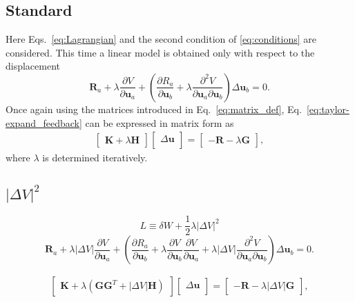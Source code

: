 \subsection{Standard}
Here Eqs.\ \eqref{eq:Lagrangian} and the second condition of \eqref{eq:conditions} are considered. This time a linear model is obtained only with respect to the displacement
%
\begin{equation}
\pmb{R}_a + \lambda \frac{\partial V}{\partial \pmb{u}_a} 
%
+ \left(\frac{\partial R_a}{\partial \pmb{u}_b} + \lambda \frac{\partial^2 V}{\partial \pmb{u}_a \partial \pmb{u}_b}  \right) \Delta \pmb{u}_b  =0.
\label{eq:taylor-expand_feedback}
\end{equation}
%
Once again using the matrices introduced in Eq.\ \eqref{eq:matrix_def}, Eq.\ \eqref{eq:taylor-expand_feedback} can be expressed in matrix form as
%
\begin{eqnarray}
\begin{bmatrix}
\textbf{K} + \lambda \textbf{H} 
\end{bmatrix}
%
\begin{bmatrix}
\Delta \textbf{u} \\
\end{bmatrix}
%
= \begin{bmatrix}
-\textbf{R}-\lambda \textbf{G} 
\end{bmatrix},
\label{eq:taylor-expand_matrix_feedback}
\end{eqnarray}
%
where $\lambda$ is determined iteratively.

\subsection{$|\Delta V|^2$ }
%
\begin{equation}
L \equiv \delta W + \frac{1}{2}\lambda |\Delta V|^2
\label{eq:squared_Lagrangian}
\end{equation}
%
%
\begin{equation}
\pmb{R}_a + \lambda  |\Delta V| \frac{\partial V}{\partial \pmb{u}_a}
%
+ \left(\frac{\partial R_a}{\partial \pmb{u}_b} + \lambda \frac{\partial V}{\partial \pmb{u}_b} \frac{\partial V}{\partial \pmb{u}_a} + \lambda |\Delta V| \frac{\partial^2 V}{\partial \pmb{u}_a \partial \pmb{u}_b} \right) \Delta \pmb{u}_b  =0.
\label{eq:squared_taylor-expand_feedback}
\end{equation}
%

%
\begin{eqnarray}
\begin{bmatrix}
\textbf{K} + \lambda \left(\textbf{G} \textbf{G}^T + |\Delta V| \textbf{H} \right) 
\end{bmatrix}
%
\begin{bmatrix}
\Delta \textbf{u} \\
\end{bmatrix}
%
= \begin{bmatrix}
-\textbf{R}-\lambda|\Delta V| \textbf{G}
\end{bmatrix},
\label{eq:squared_taylor-expand_matrix_feedback}
\end{eqnarray}
%

